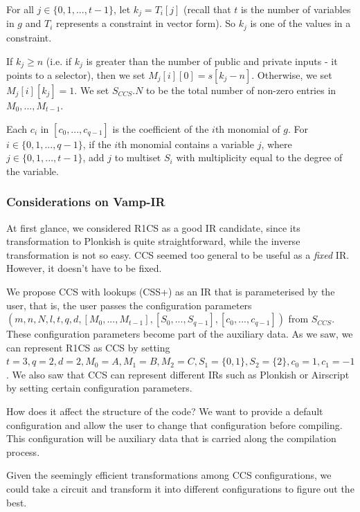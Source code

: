\documentclass[
    9pt,            %
    techreport,        %
    affiltop,       %
]{art}
\begin{document}
For all $j \in \{0, 1, ... , t - 1\}$, let $k_j = T_i[j]$ (recall that $t$ is the number of variables in $g$ and $T_i$ represents a constraint in vector form). So $k_j$ is one of the values in a constraint.

If $k_j \geq n$ (i.e. if $k_j$ is greater than the number of public and private inputs - it points to a selector), then we set $M_j[i][0] = s[k_j - n]$. Otherwise, we set $M_j[i][k_j] = 1$. We set $S_{CCS}.N$ to be the total number of non-zero entries in $M_0, ... , M_{t-1}$.

Each $c_i$ in $[c_0,...,c_{q-1}]$ is the coefficient of the $i$th monomial of $g$. For $i \in \{0, 1, ... , q - 1\}$, if the $i$th monomial contains a variable $j$, where $j \in \{0, 1, ... , t - 1\}$, add $j$ to multiset $S_i$ with multiplicity equal to the degree of the variable.


\subsubsection{Considerations on Vamp-IR}

At first glance, we considered R1CS as a good IR candidate, since its transformation to Plonkish is quite straightforward, while the inverse transformation is not so easy. CCS seemed too general to be useful as a \textit{fixed} IR. However, it doesn't have to be fixed.

We propose CCS with lookups (CSS+) as an IR that is parameterised by the user, that is, the user passes the configuration parameters $(m,n,N,l,t,q,d,[M_0,...,M_{t-1}], [S_0,...,S_{q-1}], [c_0,...,c_{q-1}])$ from $S_{CCS}$. These configuration parameters become part of the auxiliary data. As we saw, we can represent R1CS as CCS by setting $t=3, q=2, d=2, M_0=A, M_1=B, M_2=C, S_1=\{0,1\}, S_2=\{2\}, c_0=1, c_1 = -1$. We also saw that CCS can represent different IRs such as Plonkish or Airscript by setting certain configuration parameters.

How does it affect the structure of the code? We want to provide a default configuration and allow the user to change that configuration before compiling. This configuration will be auxiliary data that is carried along the compilation process.

Given the seemingly efficient transformations among CCS configurations, we could take a circuit and transform it into different configurations to figure out the best.
\end{document}
